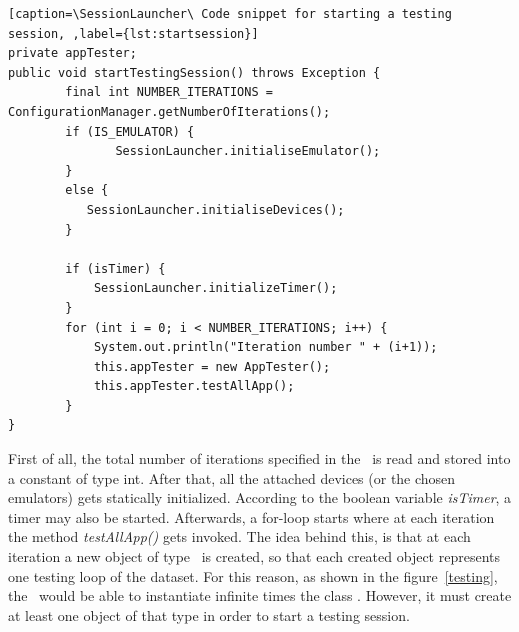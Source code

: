 \begin{lstlisting}[caption=\SessionLauncher\ Code snippet for starting a testing session, ,label={lst:startsession}]
private appTester; 
public void startTestingSession() throws Exception {
        final int NUMBER_ITERATIONS = ConfigurationManager.getNumberOfIterations();
        if (IS_EMULATOR) {
        	   SessionLauncher.initialiseEmulator();
        }
        else {
       	   SessionLauncher.initialiseDevices();
        }
       
        if (isTimer) {
            SessionLauncher.initializeTimer();
        }
        for (int i = 0; i < NUMBER_ITERATIONS; i++) {
            System.out.println("Iteration number " + (i+1));
            this.appTester = new AppTester();
            this.appTester.testAllApp();
        }
}
\end{lstlisting}
First of all, the total number of iterations specified in the \Config\ is read and stored into a constant of type int. After that, all the attached devices (or the chosen emulators) gets statically initialized. According to the boolean variable \textit{isTimer}, a timer may also be started.
Afterwards, a for-loop starts where at each iteration the method \textit{testAllApp()} gets invoked. 
The idea behind this, is that at each iteration a new object of type \AppTester\ is created, so that each created object represents one testing loop of the dataset. 
For this reason, as shown in the figure~\ref{testing}, the \SessionLauncher\ would be able to instantiate infinite times the class \AppTester. However, it must create at least one object of that type in order to start a testing session. 

